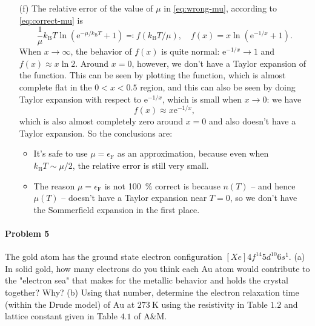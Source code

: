 \documentclass[hyperref, a4paper]{article}
\newcommand*{\ee}{\mathrm{e}}
\begin{document}
\begin{itemize}
\item[(f)] The relative error of the value of $\mu$ in \eqref{eq:wrong-mu},
according to \eqref{eq:correct-mu} is 
\begin{equation}
    \frac{1}{\mu} k_{\text{B}} T \ln (\ee^{- \mu / k_{\text{B}} T} + 1) \eqqcolon
    f(k_{\text{B}} T / \mu), \quad f(x) = x \ln (\ee^{- 1/x} + 1).
\end{equation}
When $x \to \infty$, the behavior of $f(x)$ is quite normal: $\ee^{-1/x} \to 1$ and $f(x) \approx x \ln 2$.
Around $x = 0$, however, we don't have a Taylor expansion of the function.
This can be seen by plotting the function,
which is almost complete flat in the $0 < x < 0.5$ region,
and this can also be seen by doing Taylor expansion with respect to $\ee^{- 1 / x}$, 
which is small when $x \to 0$: we have 
\[
    f(x) \approx x \ee^{- 1 / x},
\]
which is also almost completely zero around $x = 0$ and also doesn't have a Taylor expansion. 
So the conclusions are:
\begin{itemize}
    \item It's safe to use $\mu = \epsilon_{\text{F}}$ as an approximation,
    because even when $k_{\text{B}} T \sim \mu / 2$, 
    the relative error is still very small.
    \item The reason $\mu = \epsilon_{\text{F}}$ is not \SI{100}{\percent} correct 
    is because $n(T)$ -- and hence $\mu(T)$ -- doesn't have a Taylor expansion near $T = 0$,
    so we don't have the Sommerfield expansion in the first place.
\end{itemize} 

\end{itemize}

\paragraph{Problem 5} The gold atom has the ground state electron configuration $[X e] 4 f^{14} 5 d^{10} 6 s^1$.
(a) In solid gold, how many electrons do you think each Au atom would contribute to the "electron sea" that makes for the metallic behavior and holds the crystal together? Why?
(b) Using that number, determine the electron relaxation time (within the Drude model) of $\mathrm{Au}$ at $273 \mathrm{~K}$ using the resistivity in Table $1.2$ and lattice constant given in Table $4.1$ of A\&M.
\end{document}
